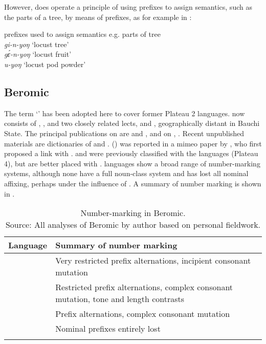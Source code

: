 \documentclass[output=paper]{langsci/langscibook}
\begin{document}
However,  does operate a principle of using prefixes to assign semantics, such as the parts of a tree, by means of prefixes, as for example in :
 
\ea\label{ex:nomaffplat:3}
 prefixes used to assign semantics e.g. parts of tree\\
\textit{gi-n-yoŋ}  ‘locust tree’\\
\textit{gɛ́-n-yoŋ}  ‘locust fruit’ \\
\textit{u-yoŋ}    ‘locust pod powder’\\
\z

 
\subsection{Beromic}

The term ‘’ has been adopted here to cover former Plateau 2 languages.  now consists of , ,  and two closely related lects,  and , geographically distant in Bauchi State. The principal publications on  are \citet{Bouquiaux1970,Bouquiaux2001} and \citet{KuhnDusu1985}, and on , \citet{Bouquiaux1964}. Recent unpublished materials are dictionaries of  and .  () was reported in a mimeo paper by \citet{Shimizu1975b}, who first proposed a link with .  and  were previously classified with the  languages (Plateau 4), but are better placed with  \citet{Blenchn.d.c}.  languages show a broad range of number-marking systems, although none have a full noun-class system and  has lost all nominal affixing, perhaps under the influence of . A summary of  number marking is shown in .

\begin{table}
\caption{\label{tab:nomaffplat:3} Number-marking in Beromic.\\ {Source: All analyses of Beromic by author based on personal fieldwork.}}
\begin{tabularx}{\textwidth}{lQ}
\lsptoprule
  Language 	&   Summary of number marking\\
\midrule
{} 	& Very restricted prefix alternations, incipient consonant mutation\\
 	& Restricted prefix alternations, complex consonant mutation, tone and length contrasts\\
 	& Prefix alternations, complex consonant mutation\\
 	& Nominal prefixes entirely lost\\
\lspbottomrule
\end{tabularx}
\end{table}
\end{document}

